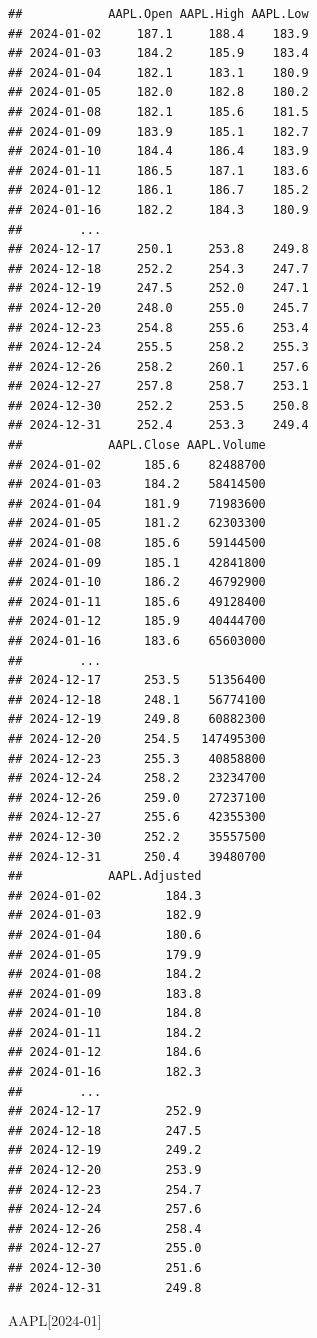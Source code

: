 \documentclass[]{ctexbook}
\newenvironment{Shaded}{\begin{snugshade}}{\end{snugshade}}
\newcommand{\NormalTok}[1]{#1}
\newcommand{\StringTok}[1]{\textcolor[rgb]{0.31,0.60,0.02}{#1}}
\begin{document}
\begin{verbatim}
##            AAPL.Open AAPL.High AAPL.Low
## 2024-01-02     187.1     188.4    183.9
## 2024-01-03     184.2     185.9    183.4
## 2024-01-04     182.1     183.1    180.9
## 2024-01-05     182.0     182.8    180.2
## 2024-01-08     182.1     185.6    181.5
## 2024-01-09     183.9     185.1    182.7
## 2024-01-10     184.4     186.4    183.9
## 2024-01-11     186.5     187.1    183.6
## 2024-01-12     186.1     186.7    185.2
## 2024-01-16     182.2     184.3    180.9
##        ...                             
## 2024-12-17     250.1     253.8    249.8
## 2024-12-18     252.2     254.3    247.7
## 2024-12-19     247.5     252.0    247.1
## 2024-12-20     248.0     255.0    245.7
## 2024-12-23     254.8     255.6    253.4
## 2024-12-24     255.5     258.2    255.3
## 2024-12-26     258.2     260.1    257.6
## 2024-12-27     257.8     258.7    253.1
## 2024-12-30     252.2     253.5    250.8
## 2024-12-31     252.4     253.3    249.4
##            AAPL.Close AAPL.Volume
## 2024-01-02      185.6    82488700
## 2024-01-03      184.2    58414500
## 2024-01-04      181.9    71983600
## 2024-01-05      181.2    62303300
## 2024-01-08      185.6    59144500
## 2024-01-09      185.1    42841800
## 2024-01-10      186.2    46792900
## 2024-01-11      185.6    49128400
## 2024-01-12      185.9    40444700
## 2024-01-16      183.6    65603000
##        ...                       
## 2024-12-17      253.5    51356400
## 2024-12-18      248.1    56774100
## 2024-12-19      249.8    60882300
## 2024-12-20      254.5   147495300
## 2024-12-23      255.3    40858800
## 2024-12-24      258.2    23234700
## 2024-12-26      259.0    27237100
## 2024-12-27      255.6    42355300
## 2024-12-30      252.2    35557500
## 2024-12-31      250.4    39480700
##            AAPL.Adjusted
## 2024-01-02         184.3
## 2024-01-03         182.9
## 2024-01-04         180.6
## 2024-01-05         179.9
## 2024-01-08         184.2
## 2024-01-09         183.8
## 2024-01-10         184.8
## 2024-01-11         184.2
## 2024-01-12         184.6
## 2024-01-16         182.3
##        ...              
## 2024-12-17         252.9
## 2024-12-18         247.5
## 2024-12-19         249.2
## 2024-12-20         253.9
## 2024-12-23         254.7
## 2024-12-24         257.6
## 2024-12-26         258.4
## 2024-12-27         255.0
## 2024-12-30         251.6
## 2024-12-31         249.8
\end{verbatim}

\begin{Shaded}
\begin{Highlighting}[]
\NormalTok{AAPL[}\StringTok{\textquotesingle{}2024{-}01\textquotesingle{}}\NormalTok{]}
\end{Highlighting}
\end{Shaded}
\end{document}
